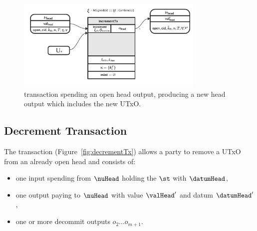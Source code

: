 \begin{figure}
	\centering
	\includegraphics[width=0.8\textwidth]{Hydra/Protocol/Figures/incrementTx.pdf}
	\caption{\mtxIncrement{} transaction spending an open head output,
		producing a new head output which includes the new UTxO.}\label{fig:incrementTx}
\end{figure}

\subsection{Decrement Transaction}\label{sec:decrement-tx}

\noindent The \mtxDecrement{} transaction (Figure~\ref{fig:decrementTx}) allows
a party to remove a UTxO from an already open head and consists of:

\begin{itemize}
	\item one input spending from $\nuHead$ holding the $\st$ with $\datumHead$,
	\item one output paying to $\nuHead$ with value $\valHead'$ and
	      datum $\datumHead'$,
	\item one or more decommit outputs $o_{2} \dots o_{m+1}$.
\end{itemize}

